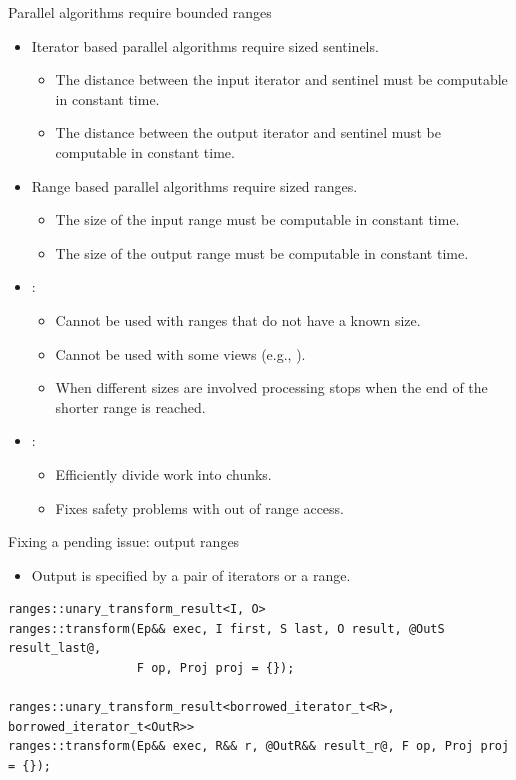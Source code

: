 \begin{frame}[t,fragile]{Parallel algorithms require bounded ranges}
\begin{itemize}
  \item Iterator based parallel algorithms require sized sentinels.
    \begin{itemize}
      \item The distance between the input iterator and sentinel must be computable in constant time.
      \item The distance between the output iterator and sentinel must be computable in constant time.
    \end{itemize}

  \item Range based parallel algorithms require sized ranges.
    \begin{itemize}
      \item The size of the input range must be computable in constant time.
      \item The size of the output range must be computable in constant time.
    \end{itemize}

  \item {}:
    \begin{itemize}
      \item Cannot be used with ranges that do not have a known size.
      \item Cannot be used with some views (e.g., ).
      \item When different sizes are involved processing stops when the end of the shorter range is reached.
    \end{itemize}

  \item {}:
    \begin{itemize}
        \item Efficiently divide work into chunks.
        \item Fixes safety problems with out of range access.
    \end{itemize}
\end{itemize}
\end{frame}

\begin{frame}[t,fragile]{Fixing a pending issue: output ranges}
\begin{itemize}
  \item Output is specified by a pair of iterators or a range.
\end{itemize}
  
\begin{lstlisting}
ranges::unary_transform_result<I, O>
ranges::transform(Ep&& exec, I first, S last, O result, @OutS result_last@,
                  F op, Proj proj = {});

ranges::unary_transform_result<borrowed_iterator_t<R>, borrowed_iterator_t<OutR>>
ranges::transform(Ep&& exec, R&& r, @OutR&& result_r@, F op, Proj proj = {});
\end{lstlisting}
\end{frame}